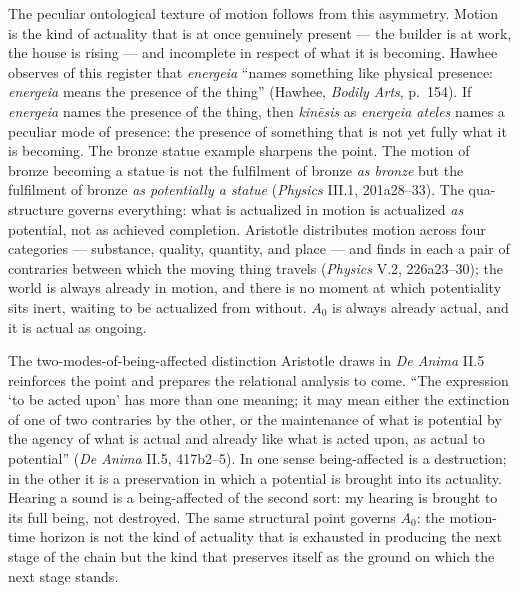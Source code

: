 The peculiar ontological texture of motion follows from this asymmetry. Motion is the kind of actuality that is at once genuinely present --- the builder is at work, the house is rising --- and incomplete in respect of what it is becoming. Hawhee observes of this register that \textit{energeia} ``names something like physical presence: \textit{energeia} means the presence of the thing'' (Hawhee, \textit{Bodily Arts}, p.~154). If \textit{energeia} names the presence of the thing, then \textit{kinēsis} as \textit{energeia ateles} names a peculiar mode of presence: the presence of something that is not yet fully what it is becoming. The bronze statue example sharpens the point. The motion of bronze becoming a statue is not the fulfilment of bronze \textit{as bronze} but the fulfilment of bronze \textit{as potentially a statue} (\textit{Physics} III.1, 201a28--33). The qua-structure governs everything: what is actualized in motion is actualized \textit{as} potential, not as achieved completion. Aristotle distributes motion across four categories --- substance, quality, quantity, and place --- and finds in each a pair of contraries between which the moving thing travels (\textit{Physics} V.2, 226a23--30); the world is always already in motion, and there is no moment at which potentiality sits inert, waiting to be actualized from without. $A_0$ is always already actual, and it is actual as ongoing.

The two-modes-of-being-affected distinction Aristotle draws in \textit{De Anima} II.5 reinforces the point and prepares the relational analysis to come. ``The expression `to be acted upon' has more than one meaning; it may mean either the extinction of one of two contraries by the other, or the maintenance of what is potential by the agency of what is actual and already like what is acted upon, as actual to potential'' (\textit{De Anima} II.5, 417b2--5). In one sense being-affected is a destruction; in the other it is a preservation in which a potential is brought into its actuality. Hearing a sound is a being-affected of the second sort: my hearing is brought to its full being, not destroyed. The same structural point governs $A_0$: the motion-time horizon is not the kind of actuality that is exhausted in producing the next stage of the chain but the kind that preserves itself as the ground on which the next stage stands.

